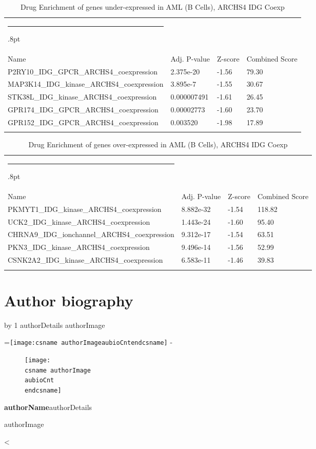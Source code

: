 \documentclass[3p,authoryear,preprint,12pt]{elsarticle}
\makeatletter
\newcounter{aubio}
\newcommand{\checkheight}[1]{%
  \par \penalty-100\begingroup%
  \setbox8=\hbox{#1}%
  \setlength{\dimen@}{\ht8}%
  \dimen@ii\pagegoal \advance\dimen@ii-\pagetotal
  \ifdim \dimen@>\dimen@ii
    \break
  \fi\endgroup}
\def\printBio{%
  \@tempcnta=0
   \loop
     \advance \@tempcnta by 1
     \def\aubioCnt{\the\@tempcnta}
     \setlength{\intextsep}{0pt}%
     \setlength{\columnsep}{10pt}%
     \newbox\boxa%
     \setbox\boxa\vbox{\csname authorDetails\aubioCnt\endcsname}
     \expandafter\ifx\csname authorImage\aubioCnt\endcsname\relax%
      \else%
       \checkheight{\texttt{[image: \\csname authorImage\\aubioCnt\\endcsname]}}
        \begin{figure}
         \texttt{[image: \\csname authorImage\\aubioCnt\\endcsname]}%
        \end{figure}\par
      \fi
     {\parindent0pt\textbf{\csname authorName\aubioCnt\endcsname}\csname authorDetails\aubioCnt\endcsname \par\bigskip%
     \expandafter\ifx\csname authorImage\aubioCnt\endcsname\relax\else%
      \ifdim\the\ht\boxa < 90pt\vskip\dimexpr(90pt -\the\ht\boxa-1pc)\fi%
     \fi}%
      \ifnum\@tempcnta < \theaubio
   \repeat
   }
\def\hlinewd#1{%
  \noalign{\ifnum0=`}\fi\hrule \@height #1%
  \futurelet\reserved@a\@xhline}
\def\tbltoprule{\hlinewd{.8pt}\\[-12pt]}
\def\tblbottomrule{\noalign{\vspace*{6pt}}\hline\noalign{\vspace*{2pt}}}
\def\tblmidrule{\noalign{\vspace*{6pt}}\hline\noalign{\vspace*{2pt}}}
\makeatother
\begin{document}
\begin{table}[!htbp]
	\caption{{Drug Enrichment of genes under-expressed in AML (B Cells), ARCHS4 IDG Coexp} }
	\label{tw-de478ae31zc6}
	\def\arraystretch{1}
	\ignorespaces 
	\centering 
	\begin{tabulary}{\linewidth}{p{\dimexpr.65\tabcolsep}p{\dimexpr.15\tabcolsep}p{\dimexpr.1\tabcolsep}p{\dimexpr.1\tabcolsep}}
		\tbltoprule Name & Adj. P-value & Z-score & Combined Score\\
		\tblmidrule
P2RY10\_IDG\_GPCR\_ARCHS4\_coexpression & 2.375e-20 & -1.56 & 79.30 \\
MAP3K14\_IDG\_kinase\_ARCHS4\_coexpression & 3.895e-7 & -1.55 & 30.67 \\
STK38L\_IDG\_kinase\_ARCHS4\_coexpression & 0.000007491 & -1.61 & 26.45 \\
GPR174\_IDG\_GPCR\_ARCHS4\_coexpression & 0.00002773 & -1.60 & 23.70 \\
GPR152\_IDG\_GPCR\_ARCHS4\_coexpression & 0.003520 & -1.98 & 17.89 \\
		\tblbottomrule
	\end{tabulary}\par 
\end{table}
\begin{table}[!htbp]
	\caption{{Drug Enrichment of genes over-expressed in AML (B Cells), ARCHS4 IDG Coexp} }
	\label{tw-de478ae32cc6}
	\def\arraystretch{1}
	\ignorespaces 
	\centering 
	\begin{tabulary}{\linewidth}{p{\dimexpr.65\tabcolsep}p{\dimexpr.15\tabcolsep}p{\dimexpr.1\tabcolsep}p{\dimexpr.1\tabcolsep}}
		\tbltoprule Name & Adj. P-value & Z-score & Combined Score\\
		\tblmidrule
PKMYT1\_IDG\_kinase\_ARCHS4\_coexpression & 8.882e-32 & -1.54 & 118.82 \\
UCK2\_IDG\_kinase\_ARCHS4\_coexpression & 1.443e-24 & -1.60 & 95.40 \\
CHRNA9\_IDG\_ionchannel\_ARCHS4\_coexpression & 9.312e-17 & -1.54 & 63.51 \\
PKN3\_IDG\_kinase\_ARCHS4\_coexpression & 9.496e-14 & -1.56 & 52.99 \\
CSNK2A2\_IDG\_kinase\_ARCHS4\_coexpression & 6.583e-11 & -1.46 & 39.83\\
		\tblbottomrule
	\end{tabulary}\par 
\end{table}


\cleardoublepage





\section*{Author biography}\noindent

\printBio 
\end{document}
